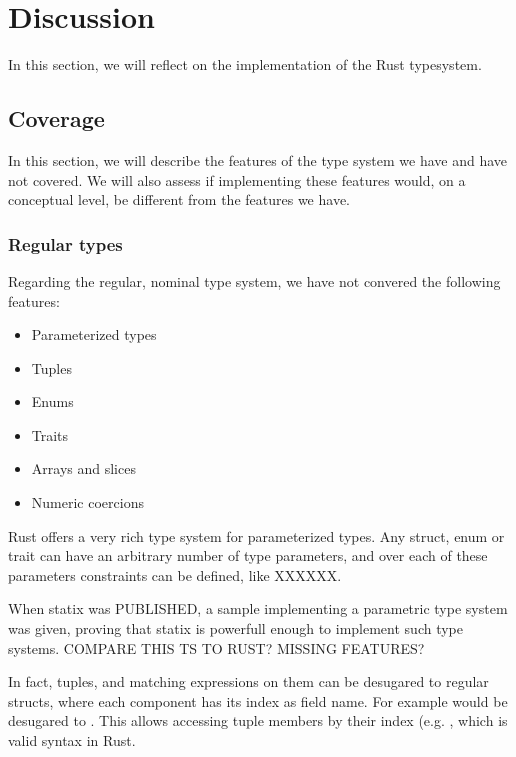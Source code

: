 \section{Discussion}\label{s:discussion}


In this section, we will reflect on the implementation of the Rust typesystem.

\subsection{Coverage}

In this section, we will describe the features of the type system we have and have not covered. We will also assess if implementing these features would, on a conceptual level, be different from the features we have.

\subsubsection{Regular types}

Regarding the regular, nominal type system, we have not convered the following features:

\begin{itemize}
	\item Parameterized types
	\item Tuples
	\item Enums
	\item Traits
	\item Arrays and slices
	\item Numeric coercions
\end{itemize}


Rust offers a very rich type system for parameterized types. Any struct, enum or trait can have an arbitrary number of type parameters, and over each of these parameters constraints can be defined, like XXXXXX.

When statix was PUBLISHED, a sample implementing a parametric type system was given, proving that statix is powerfull enough to implement such type systems. COMPARE THIS TS TO RUST? MISSING FEATURES?


In fact, tuples, and matching expressions on them can be desugared to regular structs, where each component has its index as field name. For example  would be desugared to . This allows accessing tuple members by their index (e.g. , which is valid syntax in Rust.

